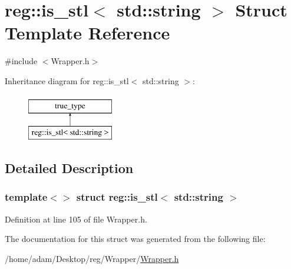 \hypertarget{structreg_1_1is__stl_3_01std_1_1string_01_4}{}\section{reg\+:\+:is\+\_\+stl$<$ std\+:\+:string $>$ Struct Template Reference}
\label{structreg_1_1is__stl_3_01std_1_1string_01_4}


{\ttfamily \#include $<$Wrapper.\+h$>$}

Inheritance diagram for reg\+:\+:is\+\_\+stl$<$ std\+:\+:string $>$\+:\begin{figure}[H]
\begin{center}
\leavevmode
\includegraphics[height=2.000000cm]{structreg_1_1is__stl_3_01std_1_1string_01_4}
\end{center}
\end{figure}


\subsection{Detailed Description}
\subsubsection*{template$<$$>$\newline
struct reg\+::is\+\_\+stl$<$ std\+::string $>$}



Definition at line 105 of file Wrapper.\+h.



The documentation for this struct was generated from the following file\+:\begin{DoxyCompactItemize}
\item 
/home/adam/\+Desktop/reg/\+Wrapper/\hyperlink{_wrapper_8h}{Wrapper.\+h}\end{DoxyCompactItemize}
